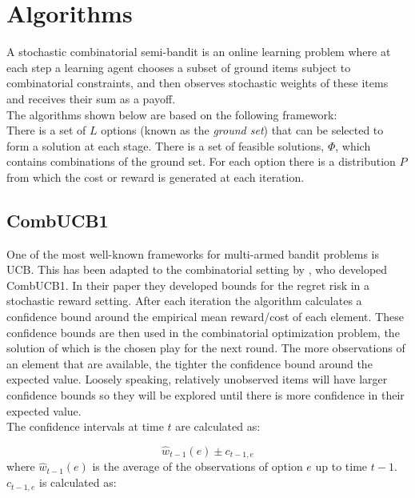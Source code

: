\pagebreak


\section{Algorithms}

A stochastic combinatorial semi-bandit is an online learning problem where at each step a learning agent chooses a subset of ground items subject to combinatorial constraints, and then observes stochastic weights of these items and receives their sum as a payoff.\\
The algorithms shown below are based on the following framework:\\There is a set of $L$ options (known as the \emph{ground set}) that can be selected to form a solution at each stage. There is a set of feasible solutions, $\Phi$, which contains combinations of the ground set. For each option there is a distribution $P$ from which the cost or reward is generated at each iteration.

\subsection{CombUCB1}

One of the most well-known frameworks for multi-armed bandit problems is UCB. This has been adapted to the combinatorial setting by \cite{kveton2015tight}, who developed CombUCB1. In their paper they developed bounds for the regret risk in a stochastic reward setting. After each iteration the algorithm calculates a confidence bound around the empirical mean reward/cost of each element. These confidence bounds are then used in the combinatorial optimization problem, the solution of which is the chosen play for the next round. The more observations of an element that are available, the tighter the confidence bound around the expected value. Loosely speaking, relatively unobserved items will have larger confidence bounds so they will be explored until there is more confidence in their expected value.\\

The confidence intervals at time $t$ are calculated as:

$$\hat{w}_{t-1}(e)\pm c_{t-1,e}$$ where $\hat{w}_{t-1}(e)$ is the average of the observations of option $e$ up to time $t-1$. $c_{t-1,e}$ is calculated as:

